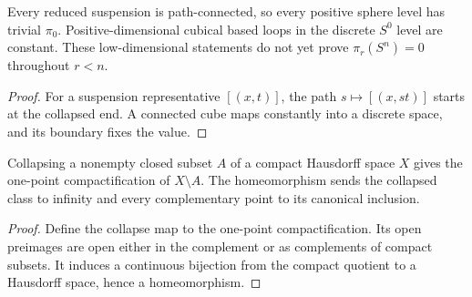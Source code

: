 \begin{proposition}
  \label{prop:point-set-sphere-low-connectivity}
  \leanok
  Every reduced suspension is path-connected, so every positive sphere
  level has trivial $\pi_0$. Positive-dimensional cubical based loops in
  the discrete $S^0$ level are constant. These low-dimensional statements
  do not yet prove $\pi_r(S^n)=0$ throughout $r<n$.
\end{proposition}
\begin{proof}
  For a suspension representative $[(x,t)]$, the path
  $s\mapsto[(x,st)]$ starts at the collapsed end. A connected cube maps
  constantly into a discrete space, and its boundary fixes the value.
  \leanok
\end{proof}

\begin{proposition}
  \label{prop:closed-collapse-one-point}
  \leanok
  Collapsing a nonempty closed subset $A$ of a compact Hausdorff space
  $X$ gives the one-point compactification of $X\setminus A$. The
  homeomorphism sends the collapsed class to infinity and every
  complementary point to its canonical inclusion.
\end{proposition}
\begin{proof}
  Define the collapse map to the one-point compactification. Its open
  preimages are open either in the complement or as complements of
  compact subsets. It induces a continuous bijection from the compact
  quotient to a Hausdorff space, hence a homeomorphism.
  \leanok
\end{proof}

